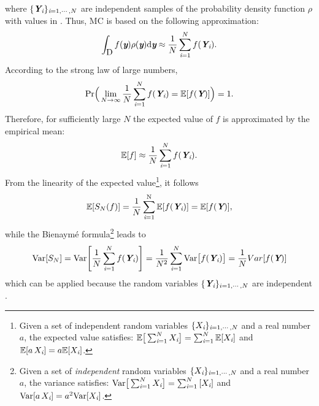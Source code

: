 where $\{\textit{\textbf{Y}}_{\textit{i}}\}_{\textit{i} = 1, \cdots, N}$ are independent samples of the probability density function $\rho$ with values in \mbox{} \cite{owen2003quasi}. Thus, MC is based on the following approximation:
\begin{equation}\label{eq:approx_MC_QMC}
\int_{\mbox{$\textup{D}$}}f(\textit{\textbf{y}})\rho(\textit{\textbf{y}}) \textrm{d}\textit{\textbf{y}}\approx\frac{1}{N} \sum_{\textit{i}=1}^{N} f(\textit{\textbf{Y}}_{\textit{i}}).
\end{equation}
According to the strong law of large numbers,
\begin{equation}
\textrm{Pr}\Big(\lim_{N\rightarrow\infty}\frac{1}{N}\sum_{\textit{i}=1}^{N} f(\textit{\textbf{Y}}_{\textit{i}}) = \mathbb{E}[f(\textit{\textbf{Y}})] \Big) = 1.
\end{equation}
Therefore, for sufficiently large $N$ the expected value of $f$ is approximated by the empirical mean:
\begin{equation}
\mathbb{E}[f] \approx \frac{1}{N} \sum_{\textit{i}=1}^{N} f(\textit{\textbf{Y}}_{\textit{i}}).
\end{equation}
From the linearity of the expected value\footnote{Given a set of independent random variables $\{X_{\textit{i}}\}_{\textit{i}=1, \cdots, N}$ and a real number $a$, the expected value satisfies:
$\mathbb{E}\big[\sum_{\textit{i}=1}^{N}X_{\textit{i}}\big] = \sum_{\textit{i}=1}^{N}\mathbb{E}[X_{\textit{i}}]$ and $\mathbb{E}[a\,X_{\textit{i}}] = a\mathbb{E}[X_{\textit{i}}]$.},
 it follows
\begin{equation}\label{eq:linearity}
\mathbb{E}[S_{N}(f)] = \frac{1}{N}\sum_{\textit{i}=1}^{\textrm{N}}\mathbb{E}[f(\textit{\textbf{Y}}_{\textit{i}})] = \mathbb{E}[f(\textit{\textbf{Y}})],
\end{equation}
while the Bienaym\'e formula\footnote{Given a set of \textit{independent} random variables $\{X_{\textit{i}}\}_{\textit{i}=1, \cdots, N}$ and a real number $a$, the variance satisfies:
$\textrm{Var}\big[\sum_{\textit{i}=1}^{N}X_{\textit{i}}\big] = \sum_{\textit{i}=1}^{N}\textrm[X_{\textit{i}}]$ and $\textrm{Var}[a\,X_{\textit{i}}] = a^2\textrm{Var}[X_{\textit{i}}]$.} leads to
\begin{equation}\label{eq:variance}
\textrm{Var}[S_{N}]= \textrm{Var}\Bigg[\frac{1}{N}\sum_{\textit{i}=1}^{N}f(\textit{\textbf{Y}}_{\textit{i}})\Bigg] =
 \frac{1}{N^2}\sum_{\textit{i}=1}^{N}\textrm{Var}\big[f(\textit{\textbf{Y}}_{\textit{i}})\big] = \frac{1}{N}Var[f(\textit{\textbf{Y}})]
\end{equation}
which can be applied because the random variables $\{\textit{\textbf{Y}}_{\textit{i}}\}_{i = 1, \cdots, N}$ are independent \cite{grinstead2012introduction}. 
